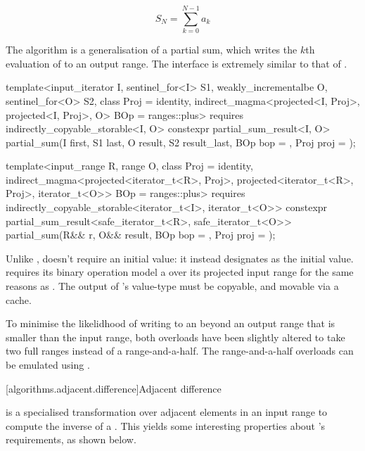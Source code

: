 $$S_N = \sum_{k = 0}^{N - 1} a_k$$

The \Cpp{} algorithm  is a generalisation of a partial sum, which writes the
$k$th evaluation of  to an output range. The interface is extremely similar to
that of .

\begin{codeblock}
template<input_iterator I, sentinel_for<I> S1, weakly_incrementalbe O, sentinel_for<O> S2,
         class Proj = identity,
         indirect_magma<projected<I, Proj>, projected<I, Proj>, O> BOp = ranges::plus>
  requires indirectly_copyable_storable<I, O>
constexpr partial_sum_result<I, O>
  partial_sum(I first, S1 last, O result, S2 result_last, BOp bop = {}, Proj proj = {});

template<input_range R, range O, class Proj = identity,
         indirect_magma<projected<iterator_t<R>, Proj>,
                        projected<iterator_t<R>, Proj>,
                        iterator_t<O>> BOp = ranges::plus>
  requires indirectly_copyable_storable<iterator_t<I>, iterator_t<O>>
constexpr partial_sum_result<safe_iterator_t<R>, safe_iterator_t<O>>
  partial_sum(R&& r, O&& result, BOp bop = {}, Proj proj = {});
\end{codeblock}

Unlike ,  doesn't require an initial value: it instead
designates  as the initial value.  requires its
binary operation model a  over its projected input range for the same reasons as
. The output of 's value-type must be copyable, and movable via
a cache.


To minimise the likelidhood of writing to an beyond an output range that is smaller than the input
range, both overloads have been slightly altered to take two full ranges instead of a
range-and-a-half. The range-and-a-half overloads can be emulated using .

[algorithms.adjacent.difference]{Adjacent difference}

 is a specialised transformation over adjacent elements in an input range
to compute the inverse of a  . This yields some
interesting properties about 's requirements, as shown below.

